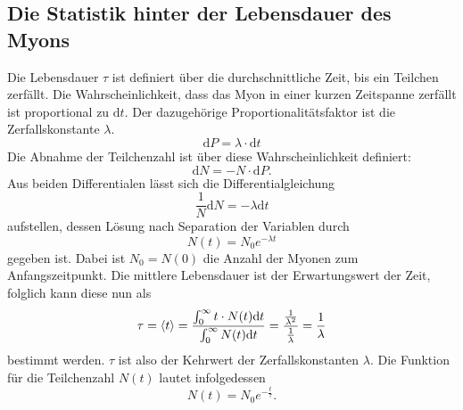 \subsection{Die Statistik hinter der Lebensdauer des Myons}
\label{sec:t2}
Die Lebensdauer $\tau$ ist definiert über die durchschnittliche Zeit, bis ein 
Teilchen zerfällt. Die Wahrscheinlichkeit, dass das Myon in einer kurzen 
Zeitspanne zerfällt ist proportional zu $\mathrm{d}t$. Der dazugehörige
Proportionalitätsfaktor ist die Zerfallskonstante $\lambda$. 
\begin{equation*}
    \mathrm{d}P = \lambda \cdot \mathrm{d}t
\end{equation*}
Die Abnahme der Teilchenzahl ist über diese Wahrscheinlichkeit definiert:
\begin{equation*}
    \mathrm{d}N = -N \cdot \mathrm{d}P.
\end{equation*}
Aus beiden Differentialen lässt sich die Differentialgleichung 
\begin{equation*}
    \frac{1}{N} \mathrm{d}N = - \lambda \mathrm{d}t
\end{equation*}
aufstellen, dessen Lösung nach Separation der Variablen durch
\begin{equation*}
    N(t) = N_0 e^{-\lambda t}
\end{equation*}
gegeben ist. Dabei ist $N_0=N(0)$ die Anzahl der Myonen zum Anfangszeitpunkt.
Die mittlere Lebensdauer ist der Erwartungswert der Zeit, folglich kann diese
nun als
\begin{equation}
    \tau = \langle t \rangle \\
         = \frac{\int_0^\infty t \cdot N(t) \mathrm{d}t}{\int_0^\infty N(t) \mathrm{d}t} 
         = \frac{\frac{1}{\lambda^2}}{\frac{1}{\lambda}} \\
         = \frac{1}{\lambda}
\end{equation}
bestimmt werden. $\tau$ ist also der Kehrwert der Zerfallskonstanten $\lambda$.
Die Funktion für die Teilchenzahl $N(t)$ lautet infolgedessen
\begin{equation}
    N(t) = N_0 e^{-\frac{t}{\tau}}.
\end{equation}



